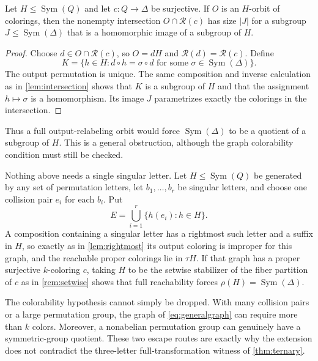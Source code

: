 \documentclass[11pt,a4paper]{article}
\numberwithin{equation}{section}
\theoremstyle{definition}
\theoremstyle{remark}
\newcommand{\D}{\Delta}
\newcommand{\Sym}{\operatorname{Sym}}
\begin{document}
\begin{proposition}\label{prop:section}
Let $H\le\Sym(Q)$ and let $c:Q\to\D$ be surjective. If $O$ is an $H$-orbit
of colorings, then the nonempty intersection $O\cap\mathcal R(c)$ has size
$|J|$ for a subgroup $J\le\Sym(\D)$ that is a homomorphic image of a subgroup
of $H$.
\end{proposition}
\begin{proof}
Choose $d\in O\cap\mathcal R(c)$, so $O=dH$ and
$\mathcal R(d)=\mathcal R(c)$. Define
\[
 K=\{h\in H:d\circ h=\sigma\circ d
                \text{ for some }\sigma\in\Sym(\D)\}.
\]
The output permutation is unique. The same composition and inverse
calculation as in \cref{lem:intersection} shows that $K$ is a subgroup of
$H$ and that the assignment $h\mapsto\sigma$ is a homomorphism. Its image
$J$ parametrizes exactly the colorings in the intersection.
\end{proof}

Thus a full output-relabeling orbit would force $\Sym(\D)$ to be a quotient
of a subgroup of $H$. This is a general obstruction, although the graph
colorability condition must still be checked.

\begin{remark}\label{rem:severalsingular}
Nothing above needs a single singular letter. Let $H\le\Sym(Q)$ be generated
by any set of permutation letters, let $b_1,\ldots,b_r$ be singular
letters, and choose one collision pair $e_i$ for each $b_i$. Put
\begin{equation}\label{eq:generalgraph}
 E=\bigcup_{i=1}^{r}\{h(e_i):h\in H\}.
\end{equation}
A composition containing a singular letter has a rightmost such letter and a
suffix in $H$, so exactly as in \cref{lem:rightmost} its output coloring is
improper for this graph, and the reachable proper colorings lie in $\tau H$.
If that graph has a proper surjective $k$-coloring $c$, taking $H$ to be the
setwise stabilizer of the fiber partition of $c$ as in \cref{rem:setwise}
shows that full reachability forces $\rho(H)=\Sym(\D)$.

The colorability hypothesis cannot simply be dropped. With many collision
pairs or a large permutation group, the graph of \eqref{eq:generalgraph} can
require more than $k$ colors. Moreover, a nonabelian permutation group can
genuinely have a symmetric-group quotient. These two escape routes are
exactly why the extension does not contradict the three-letter
full-transformation witness of \cref{thm:ternary}.
\end{remark}
\end{document}
